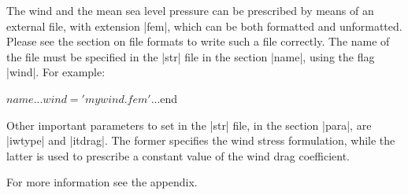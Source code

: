 
The wind and the mean sea level pressure can be prescribed by means of
an external file, with extension |fem|, which can be both formatted
and unformatted. Please see the section on file formats to write such a
file correctly.  The name of the file must be specified in the |str|
file in the section |name|, using the flag |wind|. For example:

\begin{code}
$name
...
wind = 'mywind.fem'
...
$end
\end{code}

Other important parameters to set in the |str| file, in the section
|para|, are |iwtype| and |itdrag|. The former specifies the wind stress
formulation, while the latter is used to prescribe a constant value of
the wind drag coefficient.

For more information see the appendix.

